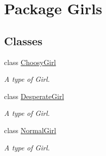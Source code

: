 \hypertarget{namespace_girls}{}\section{Package Girls}
\label{namespace_girls}
\subsection*{Classes}
\begin{DoxyCompactItemize}
\item 
class \hyperlink{class_girls_1_1_choosy_girl}{Choosy\+Girl}
\begin{DoxyCompactList}\small\item\em A type of Girl. \end{DoxyCompactList}\item 
class \hyperlink{class_girls_1_1_desperate_girl}{Desperate\+Girl}
\begin{DoxyCompactList}\small\item\em A type of Girl. \end{DoxyCompactList}\item 
class \hyperlink{class_girls_1_1_normal_girl}{Normal\+Girl}
\begin{DoxyCompactList}\small\item\em A type of Girl. \end{DoxyCompactList}\end{DoxyCompactItemize}

